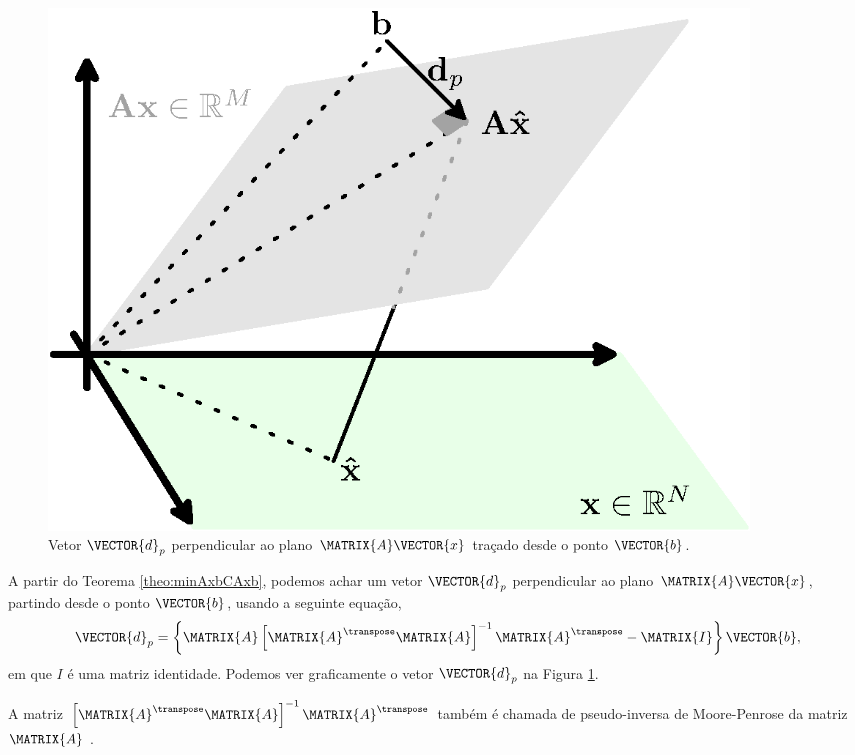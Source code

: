\begin{corollary} 
\label{coro:minAxbCAxb1} ~

\noindent
\begin{minipage}{0.49\textwidth}
\centering
\begin{minipage}{0.90\textwidth}
     \begin{figure}[H]
         \centering
         \includegraphics[width=0.9\textwidth]{chapters/minimization-fx/minimo-linear1.eps}
         \caption{Vetor $\VECTOR{d}_p$ perpendicular ao plano 
$\MATRIX{A}\VECTOR{x}$ traçado desde o ponto $\VECTOR{b}$. }
         \label{fig:coro:minAxbCAxb1:a}
     \end{figure}
\end{minipage}
\end{minipage}
\begin{minipage}{0.49\textwidth}
A partir do Teorema \ref{theo:minAxbCAxb}, 
podemos achar um vetor $\VECTOR{d}_p$ perpendicular ao plano $\MATRIX{A}\VECTOR{x}$,
partindo desde o ponto $\VECTOR{b}$, usando a seguinte equação,
\begin{equation}
\VECTOR{d}_p = \left\{\MATRIX{A}\left[ \MATRIX{A}^{\transpose}\MATRIX{A} \right]^{-1}\MATRIX{A}^{\transpose}- \MATRIX{I}\right\}\VECTOR{b},
\end{equation}
em que $I$ é uma matriz identidade.
Podemos ver graficamente o vetor $\VECTOR{d}_p$ na Figura \ref{fig:coro:minAxbCAxb1:a}.
\begin{tcbattention}
A matriz $\left[ \MATRIX{A}^{\transpose}\MATRIX{A} \right]^{-1}\MATRIX{A}^{\transpose}$
também é chamada de pseudo-inversa de Moore-Penrose da matriz $\MATRIX{A}$ \cite[pp. 290]{golub2013matrix}.
\end{tcbattention}
\end{minipage}
\end{corollary}

